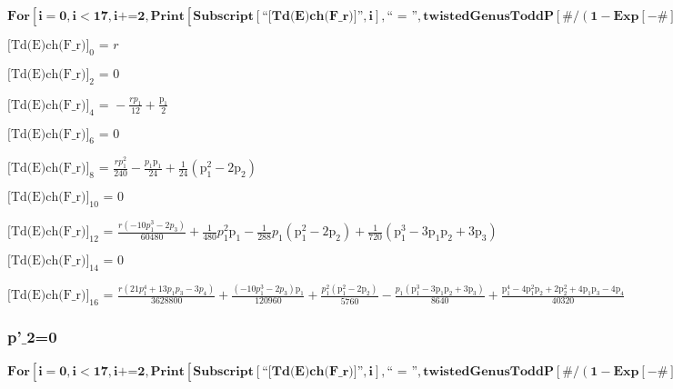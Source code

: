 \documentclass{article}
\newcommand{\unicode}[1]{{}}
\begin{document}
\begin{doublespace}
\noindent\(\pmb{\text{For}\left[i=0,i<17,i\text{+=}2, \text{Print}\left[\text{Subscript}[\text{{``}[Td(E)ch(F$\_$r)]{''}},i],\text{{``} = {''}},\text{twistedGenusToddP}[\#/(1-\text{Exp}[-\#])\&,i]\text{/.}p_2\to
0\right]\right]}\)
\end{doublespace}

\noindent\(\text{[Td(E)ch(F$\_$r)]}_0\text{ = }r\)

\noindent\(\text{[Td(E)ch(F$\_$r)]}_2\text{ = }0\)

\noindent\(\text{[Td(E)ch(F$\_$r)]}_4\text{ = }-\frac{r p_1}{12}+\frac{\text{p$\unicode{02bc}$}_1}{2}\)

\noindent\(\text{[Td(E)ch(F$\_$r)]}_6\text{ = }0\)

\noindent\(\text{[Td(E)ch(F$\_$r)]}_8\text{ = }\frac{r p_1^2}{240}-\frac{p_1 \text{p$\unicode{02bc}$}_1}{24}+\frac{1}{24} \left(\text{p$\unicode{02bc}$}_1^2-2
\text{p$\unicode{02bc}$}_2\right)\)

\noindent\(\text{[Td(E)ch(F$\_$r)]}_{10}\text{ = }0\)

\noindent\(\text{[Td(E)ch(F$\_$r)]}_{12}\text{ = }\frac{r \left(-10 p_1^3-2 p_3\right)}{60480}+\frac{1}{480} p_1^2 \text{p$\unicode{02bc}$}_1-\frac{1}{288}
p_1 \left(\text{p$\unicode{02bc}$}_1^2-2 \text{p$\unicode{02bc}$}_2\right)+\frac{1}{720} \left(\text{p$\unicode{02bc}$}_1^3-3 \text{p$\unicode{02bc}$}_1
\text{p$\unicode{02bc}$}_2+3 \text{p$\unicode{02bc}$}_3\right)\)

\noindent\(\text{[Td(E)ch(F$\_$r)]}_{14}\text{ = }0\)

\noindent\(\text{[Td(E)ch(F$\_$r)]}_{16}\text{ = }\frac{r \left(21 p_1^4+13 p_1 p_3-3 p_4\right)}{3628800}+\frac{\left(-10 p_1^3-2 p_3\right) \text{p$\unicode{02bc}$}_1}{120960}+\frac{p_1^2
\left(\text{p$\unicode{02bc}$}_1^2-2 \text{p$\unicode{02bc}$}_2\right)}{5760}-\frac{p_1 \left(\text{p$\unicode{02bc}$}_1^3-3 \text{p$\unicode{02bc}$}_1
\text{p$\unicode{02bc}$}_2+3 \text{p$\unicode{02bc}$}_3\right)}{8640}+\frac{\text{p$\unicode{02bc}$}_1^4-4 \text{p$\unicode{02bc}$}_1^2 \text{p$\unicode{02bc}$}_2+2
\text{p$\unicode{02bc}$}_2^2+4 \text{p$\unicode{02bc}$}_1 \text{p$\unicode{02bc}$}_3-4 \text{p$\unicode{02bc}$}_4}{40320}\)

\subsubsection*{p{'}$\_$2=0}

\begin{doublespace}
\noindent\(\pmb{\text{For}\left[i=0,i<17,i\text{+=}2, \text{Print}\left[\text{Subscript}[\text{{``}[Td(E)ch(F$\_$r)]{''}},i],\text{{``} = {''}},\text{twistedGenusToddP}[\#/(1-\text{Exp}[-\#])\&,i]\text{/.}\text{p$\unicode{02bc}$}_2\to
0\right]\right]}\)
\end{doublespace}
\end{document}
